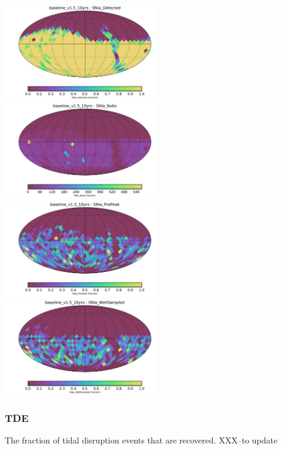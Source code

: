 {\includegraphics[width=0.5\textwidth]{metric_summary/sci_baseline_v1.5_10yrs/baseline_v1_5_10yrs_SNIa_Detected_USER_SkyMap.pdf}
\includegraphics[width=0.5\textwidth]{metric_summary/sci_baseline_v1.5_10yrs/baseline_v1_5_10yrs_SNIa_Nobs_USER_SkyMap.pdf}
\includegraphics[width=0.5\textwidth]{metric_summary/sci_baseline_v1.5_10yrs/baseline_v1_5_10yrs_SNIa_PrePeak_USER_SkyMap.pdf}
\includegraphics[width=0.5\textwidth]{metric_summary/sci_baseline_v1.5_10yrs/baseline_v1_5_10yrs_SNIa_WellSampled_USER_SkyMap.pdf}

\subsubsection{TDE}

The fraction of tidal disruption events that are recovered.
XXX--to update

}
